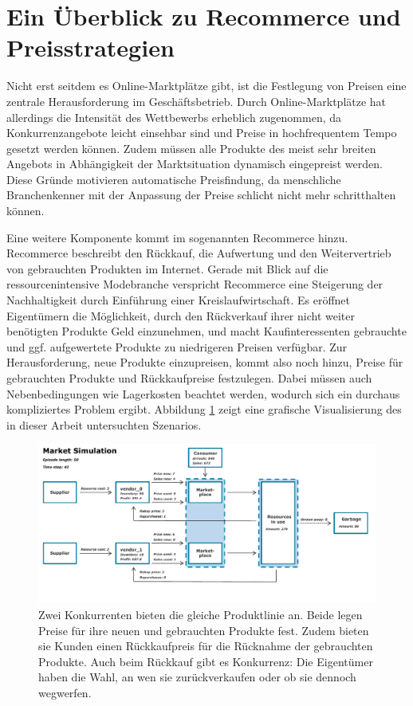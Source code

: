\section{Ein Überblick zu Recommerce und Preisstrategien}
Nicht erst seitdem es Online-Marktplätze gibt, ist die Festlegung von Preisen eine zentrale Herausforderung im Geschäftsbetrieb.
Durch Online-Marktplätze hat allerdings die Intensität des Wettbewerbs erheblich zugenommen, da Konkurrenzangebote leicht einsehbar sind und Preise in hochfrequentem Tempo gesetzt werden können.
Zudem müssen alle Produkte des meist sehr breiten Angebots in Abhängigkeit der Marktsituation dynamisch eingepreist werden.
Diese Gründe motivieren automatische Preisfindung, da menschliche Branchenkenner mit der Anpassung der Preise schlicht nicht mehr schritthalten können.

Eine weitere Komponente kommt im sogenannten Recommerce hinzu.
Recommerce beschreibt den Rückkauf, die Aufwertung und den Weitervertrieb von gebrauchten Produkten im Internet. %
Gerade mit Blick auf die ressourcenintensive Modebranche verspricht Recommerce eine Steigerung der Nachhaltigkeit durch Einführung einer Kreislaufwirtschaft.
Es eröffnet Eigentümern die Möglichkeit, durch den Rückverkauf ihrer nicht weiter benötigten Produkte Geld einzunehmen, und macht Kaufinteressenten gebrauchte und ggf. aufgewertete Produkte zu niedrigeren Preisen verfügbar.
Zur Herausforderung, neue Produkte einzupreisen, kommt also noch hinzu, Preise für gebrauchten Produkte und Rückkaufpreise festzulegen.
Dabei müssen auch Nebenbedingungen wie Lagerkosten beachtet werden, wodurch sich ein durchaus kompliziertes Problem ergibt.
Abbildung \ref{grafic:MarketOverview} zeigt eine grafische Visualisierung des in dieser Arbeit untersuchten Szenarios.

\begin{figure}[htbp]
	\centering
	\includegraphics[width=\textwidth]{introduction/MarketOverview_042.pdf}
	\caption{
		Zwei Konkurrenten bieten die gleiche Produktlinie an.
		Beide legen Preise für ihre neuen und gebrauchten Produkte fest.
		Zudem bieten sie Kunden einen Rückkaufpreis für die Rücknahme der gebrauchten Produkte.
		Auch beim Rückkauf gibt es Konkurrenz: Die Eigentümer haben die Wahl, an wen sie zurückverkaufen oder ob sie dennoch wegwerfen.
	}
	\label{grafic:MarketOverview}
\end{figure}

